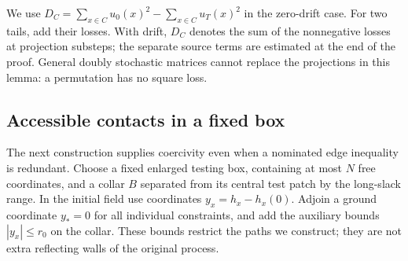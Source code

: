 We use $D_C=\sum_{x\in C}u_0(x)^2-\sum_{x\in C}u_T(x)^2$ in the
zero-drift case. For two tails, add their losses. With drift, $D_C$ denotes
the sum of the nonnegative losses at projection substeps; the separate
source terms are estimated at the end of the proof. General doubly
stochastic matrices cannot replace the projections in this lemma: a
permutation has no square loss.

\subsection{Accessible contacts in a fixed box}

The next construction supplies coercivity even when a nominated edge
inequality is redundant. Choose a fixed enlarged testing box, containing
at most $N$ free coordinates, and a collar $B$ separated from its central
test patch by the long-slack range. In the initial field use coordinates
$y_x=h_x-h_x(0)$. Adjoin a ground coordinate $y_*=0$ for all individual
constraints, and add the auxiliary bounds $|y_x|\le r_0$ on the collar.
These bounds restrict the paths we construct; they are not extra reflecting
walls of the original process.

